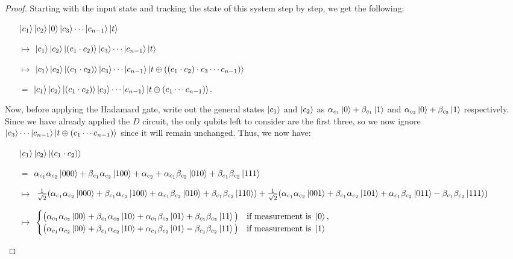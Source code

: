 \documentclass[12pt]{dalthesis}
\begin{document}
\begin{proof}
Starting with the input state and tracking the state of this system step by step, we get the following: 
\begin{itemize}
\item[] $\ket{c_1}\ket{c_2}\ket{0}\ket{c_3} \cdots \ket{c_{n-1}}\ket{t}$
\item[$\mapsto$] $\ket{c_1}\ket{c_2}\ket{(c_1 \cdot c_2)}\ket{c_3} \cdots \ket{c_{n-1}}\ket{t}$
\item[$\mapsto$] $\ket{c_1}\ket{c_2}\ket{(c_1 \cdot c_2)}\ket{c_3} \cdots \ket{c_{n-1}} \ket{t \oplus ((c_1 \cdot c_2) \cdot c_3 \cdots c_{n-1})}$
\item[$=$] $\ket{c_1}\ket{c_2}\ket{(c_1 \cdot c_2)}\ket{c_3} \cdots \ket{c_{n-1}} \ket{t \oplus (c_1 \cdots c_{n-1})}$.
\end{itemize}
Now, before applying the Hadamard gate, write out the general states $\ket{c_1}$ and $\ket{c_2}$ as $\alpha_{c_1} \ket{0} + \beta_{c_1} \ket{1}$ and $\alpha_{c_2} \ket{0} + \beta_{c_2} \ket{1}$ respectively. Since we have already applied the $D$ circuit, the only qubits left to consider are the first three, so we now ignore $\ket{c_3} \cdots \ket{c_{n-1}} \ket{t \oplus (c_1 \cdots c_{n-1})}$ since it will remain unchanged. Thus, we now have:
\begin{itemize}
\item[] $\ket{c_1}\ket{c_2}\ket{(c_1 \cdot c_2)} $
\item[$=$] $\alpha_{c_1}\alpha_{c_2} \ket{000} + \beta_{c_1}\alpha_{c_2} \ket{100} + \alpha_{c_2} + \alpha_{c_1}\beta_{c_2} \ket{010} + \beta_{c_1}\beta_{c_2} \ket{111}$

\item[$\mapsto$] $ \frac{1}{\sqrt{2}} (\alpha_{c_1}\alpha_{c_2} \ket{000} + \beta_{c_1}\alpha_{c_2} \ket{100} + \alpha_{c_1}\beta_{c_2} \ket{010} + \beta_{c_1}\beta_{c_2} \ket{110})
+ \frac{1}{\sqrt{2}} (\alpha_{c_1}\alpha_{c_2} \ket{001} + \beta_{c_1}\alpha_{c_2} \ket{101} + \alpha_{c_1}\beta_{c_2} \ket{011} - \beta_{c_1}\beta_{c_2} \ket{111}) $


\item[$\mapsto$] 
$\begin{cases} \big( \alpha_{c_1}\alpha_{c_2} \ket{00} + \beta_{c_1}\alpha_{c_2} \ket{10} + \alpha_{c_1}\beta_{c_2} \ket{01} + \beta_{c_1}\beta_{c_2} \ket{11} \big) & \mbox{if measurement is } \ket{0} , \\
\big( \alpha_{c_1}\alpha_{c_2} \ket{00} + \beta_{c_1}\alpha_{c_2} \ket{10} + \alpha_{c_1}\beta_{c_2} \ket{01} - \beta_{c_1}\beta_{c_2} \ket{11} \big) & \mbox{if measurement is } \ket{1} \end{cases}$


\end{itemize}
\end{proof}
\end{document}
